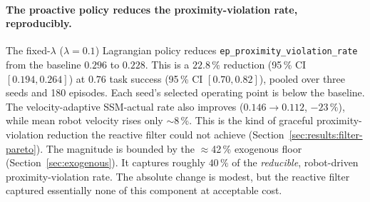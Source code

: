 \documentclass[11pt,a4paper]{report}
\newcommand{\ssm}{SSM}
\begin{document}
\paragraph{The proactive policy reduces the proximity-violation rate, reproducibly.}
The fixed-$\lambda$ ($\lambda = 0.1$) Lagrangian policy reduces
\texttt{ep\_proximity\_violation\_rate} from the baseline $0.296$ to
$0.228$. This is a $22.8\,\%$ reduction (95\,\% CI
$[0.194, 0.264]$) at $0.76$ task success (95\,\% CI $[0.70, 0.82]$), pooled
over three seeds and 180 episodes. Each seed's selected operating
point is below the baseline. The velocity-adaptive \ssm{}-actual rate
also improves ($0.146 \rightarrow 0.112$, $-23\,\%$), while mean robot
velocity rises only $\sim$8\,\%. This is the kind of graceful
proximity-violation reduction the reactive filter could not achieve
(Section~\ref{sec:results:filter-pareto}). The magnitude is bounded by
the $\approx$42\,\% exogenous floor (Section~\ref{sec:exogenous}). It
captures roughly $40\,\%$ of the \emph{reducible}, robot-driven
proximity-violation rate. The absolute change is modest, but the reactive filter
captured essentially none of this component at acceptable cost.

\begin{table}[htbp]
\centering
\caption{Experiment E4.1 (\textbf{the headline}). The division of
labour between the proactive policy and a complementary-axis runtime
filter on \texttt{saucepan\_to\_hob} under \texttt{coworker\_train},
\texttt{noisy} perception. Rows 1 and 3 evaluate the single stage-2
baseline policy over 60 episodes (3 evaluation seeds $\times$ 20);
rows 2 and 4 pool three independently trained seeds (180 episodes).
Brackets are 95\,\% bootstrap CIs. The policy owns the
exposure axis ($\tau = 0.3$\,m proximity-violation rate); the graded speed-scaling
filter owns the velocity-adaptive \ssm{}-actual axis; only their
composition reduces both at once, at a multiplicative success cost.
$\Delta$ columns are relative to the unconstrained baseline (negative
is safer). The two SVF-veto configurations are in
Table~\ref{tab:filter-taxonomy}.}
\label{tab:e4.1-feature-incremental}
\small
\setlength{\tabcolsep}{4pt}
\end{table}
\end{document}
